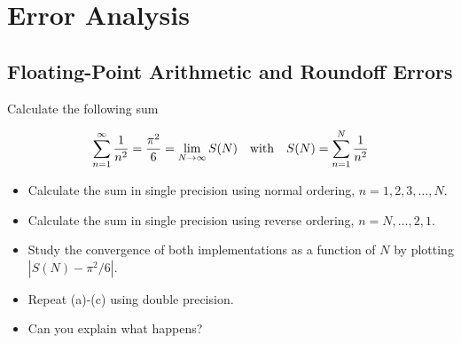 \section{Error Analysis}
\subsection{Floating-Point Arithmetic and Roundoff Errors}
\begin{exercise}
    Calculate the following sum

    \[
      \sum_{n=1}^\infty {1\over n^2}={\pi^2\over 6}
      =\lim_{N\to\infty} S(N)
      \quad
      \text{with}
      \quad
      S(N)=\sum_{n=1}^N {1\over n^2}
    \]

    \begin{itemize}
        \item Calculate the sum in single precision using normal ordering, $n=1,2,3,\ldots,N$.
        \item Calculate the sum in single precision using reverse ordering, $n=N,\ldots,2,1$.
        \item Study the convergence of both implementations as a function of $N$ by plotting $|S(N)-\pi^2/6|$.
        \item Repeat (a)-(c) using double precision.
        \item Can you explain what happens?
    \end{itemize}
\end{exercise}

